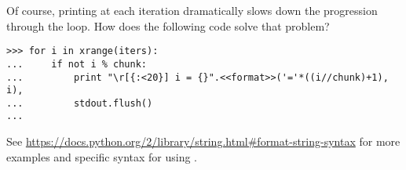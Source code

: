 Of course, printing at each iteration dramatically slows down the progression through the loop.
How does the following code solve that problem?

\begin{lstlisting}
>>> for i in xrange(iters):
...     if not i % chunk:
...         print "\r[{:<20}] i = {}".<<format>>('='*((i//chunk)+1), i),
...         stdout.flush()
...
\end{lstlisting}

See \url{https://docs.python.org/2/library/string.html\#format-string-syntax} for more examples and specific syntax for using .
